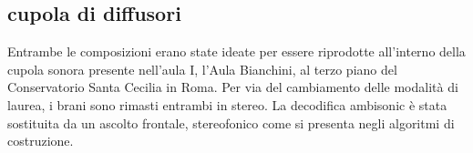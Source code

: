 \subsection{cupola di diffusori}
 
Entrambe le composizioni erano state ideate per essere riprodotte all'interno della cupola sonora presente nell'aula I, l'Aula Bianchini, al terzo piano del Conservatorio Santa Cecilia in Roma. Per via del cambiamento delle modalità di laurea, i brani sono rimasti entrambi in stereo. La decodifica ambisonic è stata sostituita da un ascolto frontale, stereofonico come si presenta negli algoritmi di costruzione. \\